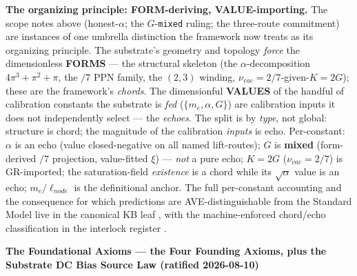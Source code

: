 \vspace{0.5em}
\noindent \textbf{The organizing principle: FORM-deriving, VALUE-importing.} The scope notes above (honest-$\alpha$; the $G$-\texttt{mixed} ruling; the three-route commitment) are instances of one umbrella distinction the framework now treats as its organizing principle. The substrate's geometry and topology \emph{force} the dimensionless \textbf{FORMS} --- the structural skeleton (the $\alpha$-decomposition $4\pi^3 + \pi^2 + \pi$, the $/7$ PPN family, the $(2,3)$ winding, $\nu_{vac} = 2/7$-given-$K{=}2G$); these are the framework's \emph{chords}. The dimensionful \textbf{VALUES} of the handful of calibration constants the substrate is \emph{fed} ($\{m_e, \alpha, G\}$) are calibration inputs it does not independently select --- the \emph{echoes}. The split is by \emph{type}, not global: structure is chord; the magnitude of the calibration \emph{inputs} is echo. Per-constant: $\alpha$ is an echo (value closed-negative on all named lift-routes); $G$ is \textbf{mixed} (form-derived $/7$ projection, value-fitted $\xi$) --- \emph{not} a pure echo; $K{=}2G$ ($\nu_{vac} = 2/7$) is GR-imported; the saturation-field \emph{existence} is a chord while its $\sqrt{\alpha}$ value is an echo; $m_e/\ell_{node}$ is the definitional anchor. The full per-constant accounting and the consequence for which predictions are AVE-distinguishable from the Standard Model live in the canonical KB leaf , with the machine-enforced chord/echo classification in the interlock register .



\vspace{1.5em}
\noindent \textbf{The Foundational Axioms --- the Four Founding Axioms, plus the Substrate DC Bias Source Law (ratified 2026-08-10)}

